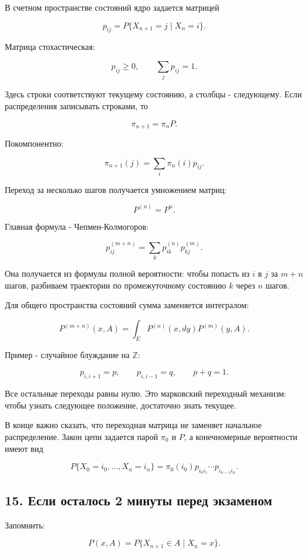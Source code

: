 \documentclass[
  11pt,
  a4paper,
]{article}
\begin{document}
В счетном пространстве состояний ядро задается матрицей

\[
p_{ij}=P\{X_{n+1}=j\mid X_n=i\}.
\]

Матрица стохастическая:

\[
p_{ij}\ge0,
\qquad
\sum_jp_{ij}=1.
\]

Здесь строки соответствуют текущему состоянию, а столбцы - следующему.
Если распределения записывать строками, то

\[
\pi_{n+1}=\pi_nP.
\]

Покомпонентно:

\[
\pi_{n+1}(j)=\sum_i\pi_n(i)p_{ij}.
\]

Переход за несколько шагов получается умножением матриц:

\[
P^{(n)}=P^n.
\]

Главная формула - Чепмен-Колмогоров:

\[
p_{ij}^{(m+n)}
=
\sum_kp_{ik}^{(n)}p_{kj}^{(m)}.
\]

Она получается из формулы полной вероятности: чтобы попасть из \(i\) в
\(j\) за \(m+n\) шагов, разбиваем траектории по промежуточному состоянию
\(k\) через \(n\) шагов.

Для общего пространства состояний сумма заменяется интегралом:

\[
P^{(m+n)}(x,A)
=
\int_E P^{(n)}(x,dy)P^{(m)}(y,A).
\]

Пример - случайное блуждание на \(\mathbb Z\):

\[
p_{i,i+1}=p,
\qquad
p_{i,i-1}=q,
\qquad
p+q=1.
\]

Все остальные переходы равны нулю. Это марковский переходный механизм:
чтобы узнать следующее положение, достаточно знать текущее.

В конце важно сказать, что переходная матрица не заменяет начальное
распределение. Закон цепи задается парой \(\pi_0\) и \(P\), а
конечномерные вероятности имеют вид

\[
P\{X_0=i_0,\ldots,X_n=i_n\}
=
\pi_0(i_0)p_{i_0i_1}\cdots p_{i_{n-1}i_n}.
\]

\subsection{15. Если осталось 2 минуты перед
экзаменом}\label{ux435ux441ux43bux438-ux43eux441ux442ux430ux43bux43eux441ux44c-2-ux43cux438ux43dux443ux442ux44b-ux43fux435ux440ux435ux434-ux44dux43aux437ux430ux43cux435ux43dux43eux43c}

Запомнить:

\[
P(x,A)=P\{X_{n+1}\in A\mid X_n=x\}.
\]
\end{document}

